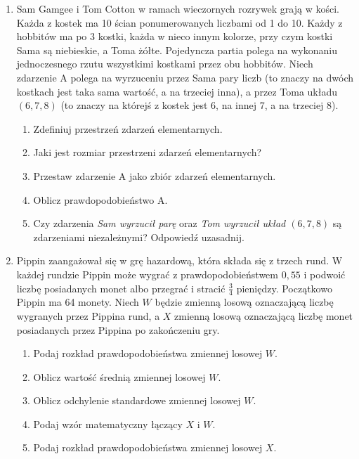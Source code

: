 \documentclass{mwart}
\begin{document}
\begin{enumerate}
\item Sam Gamgee i Tom Cotton w ramach wieczornych rozrywek grają w kości.
Każda z kostek ma 10 ścian ponumerowanych liczbami od 1 do 10.
Każdy z hobbitów ma po 3 kostki, każda w nieco innym kolorze, przy czym kostki Sama są niebieskie, a Toma żółte.
Pojedyncza partia polega na wykonaniu jednoczesnego rzutu wszystkimi kostkami przez obu hobbitów.
Niech zdarzenie A polega na wyrzuceniu przez Sama pary liczb (to znaczy na dwóch kostkach jest taka sama wartość, a na trzeciej inna), a przez Toma układu $(6,7,8)$ (to znaczy na którejś z kostek jest 6, na innej 7, a na trzeciej 8).
\begin{enumerate}
\item Zdefiniuj przestrzeń zdarzeń elementarnych.
\item Jaki jest rozmiar przestrzeni zdarzeń elementarnych?
\item Przestaw zdarzenie A jako zbiór zdarzeń elementarnych.
\item Oblicz prawdopodobieństwo A.
\item Czy zdarzenia \emph{Sam wyrzucił parę} oraz \emph{Tom wyrzucił układ $(6,7,8)$} są zdarzeniami niezależnymi? Odpowiedź uzasadnij.
\end{enumerate}

\item Pippin zaangażował się w grę hazardową, która składa się z trzech rund.
W każdej rundzie Pippin może wygrać z prawdopodobieństwem $0{,}55$ i podwoić liczbę posiadanych monet albo przegrać i stracić $\frac{3}{4}$ pieniędzy.
Początkowo Pippin ma 64 monety.
Niech $W$ będzie zmienną losową oznaczającą liczbę wygranych przez Pippina rund, a $X$ zmienną losową oznaczającą liczbę monet posiadanych przez Pippina po zakończeniu gry.
\begin{enumerate}
\item Podaj rozkład prawdopodobieństwa zmiennej losowej $W$.
\item Oblicz wartość średnią zmiennej losowej $W$.
\item Oblicz odchylenie standardowe zmiennej losowej $W$.
\item Podaj wzór matematyczny łączący $X$ i $W$.
\item Podaj rozkład prawdopodobieństwa zmiennej losowej $X$.
\end{enumerate}


\end{enumerate}
\end{document}
